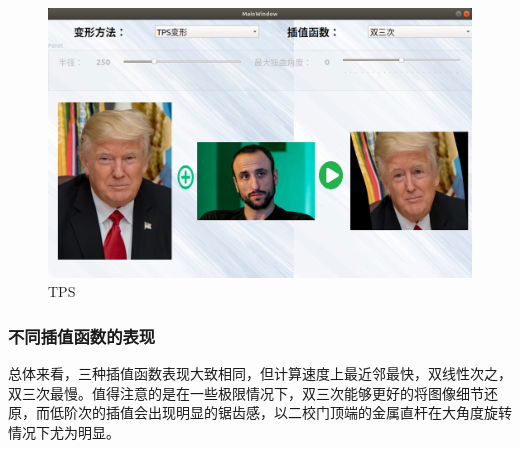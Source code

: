 \documentclass[UTF8]{ctexart}
\begin{document}
\begin{figure}[H]
    \centering
    \includegraphics[scale=0.3]{../images/report-images/trump.png}
    \caption{TPS}
\end{figure}

\subsubsection{不同插值函数的表现}
总体来看，三种插值函数表现大致相同，但计算速度上最近邻最快，双线性次之，双三次最慢。值得注意的是在一些极限情况下，双三次能够更好的将图像细节还原，而低阶次的插值会出现明显的锯齿感，以二校门顶端的金属直杆在大角度旋转情况下尤为明显。
\end{document}
